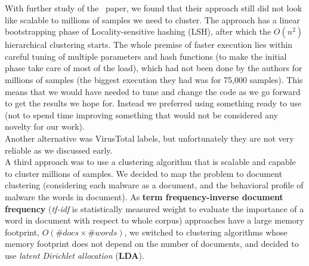 With further study of the~\cite[Bayer]{bayer} paper, we found that their approach still did not look like scalable to millions of samples we need to cluster.
The approach has a linear bootstrapping phase of Locality-sensitive hashing (LSH), after which the $O(n^2)$ hierarchical clustering starts.
The whole premise of faster execution lies within careful tuning of multiple parameters and hash functions (to make the initial phase take care of most of the load), which had not been done by the authors for millions of samples (the biggest execution they had was for 75,000 samples).
This means that we would have needed to tune and change the code as we go forward to get the results we hope for.
Instead we preferred using something ready to use (not to spend time improving something that would not be considered any novelty for our work).
\\
Another alternative was VirusTotal labels, but unfortunately they are not very reliable as we discussed early.
\\
A third approach was to use a clustering algorithm that is scalable and capable to cluster millions of samples.
We decided to map the problem to document clustering (considering each malware as a document, and the behavioral profile of malware the words in document).
As \textbf{term frequency-inverse document frequency} (\emph{tf-idf} is statistically measured weight to evaluate the importance of a word in document with respect to whole corpus) approaches have a large memory footprint, $O(\#docs \times \#words)$, we switched to clustering algorithms whose memory footprint does not depend on the number of documents, and decided to use \textit{latent Dirichlet allocation} (\textbf{LDA}).
\\
